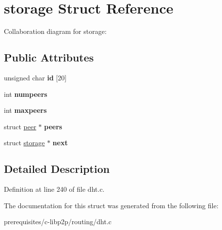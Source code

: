 \hypertarget{structstorage}{}\section{storage Struct Reference}
\label{structstorage}


Collaboration diagram for storage\+:
\subsection*{Public Attributes}
\begin{DoxyCompactItemize}
\item 
\mbox{\label{structstorage_ac65cda82bc09e5a2401a824fcdc6389b}} 
unsigned char {\bfseries id} \mbox{[}20\mbox{]}
\item 
\mbox{\label{structstorage_a0ca14f9f280994aba26f75805418ab2f}} 
int {\bfseries numpeers}
\item 
\mbox{\label{structstorage_aa99c96d79b9517dd6a5a1d86c04f93ef}} 
int {\bfseries maxpeers}
\item 
\mbox{\label{structstorage_a98c21cd5d937847f51a92bd1aaf430ab}} 
struct \mbox{\hyperlink{structpeer}{peer}} $\ast$ {\bfseries peers}
\item 
\mbox{\label{structstorage_a6f1626115532678eea87e1225d476002}} 
struct \mbox{\hyperlink{structstorage}{storage}} $\ast$ {\bfseries next}
\end{DoxyCompactItemize}


\subsection{Detailed Description}


Definition at line 240 of file dht.\+c.



The documentation for this struct was generated from the following file\+:\begin{DoxyCompactItemize}
\item 
prerequisites/c-\/libp2p/routing/dht.\+c\end{DoxyCompactItemize}
